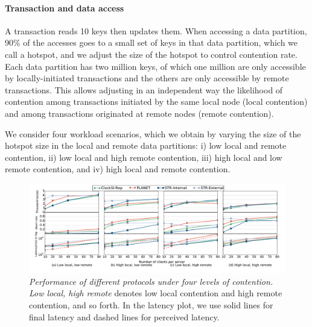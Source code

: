 \paragraph{Transaction and data access} A transaction reads 10 keys then updates them. When accessing a data partition, 90\% of the accesses goes to a small set of keys in that data partition, which we call a hotspot, and we adjust the size of the hotspot to control contention rate. Each data partition has two million keys, of which one million are only accessible by locally-initiated transactions and the others are only accessible by remote transactions. This allows adjusting in an independent way  the likelihood of contention among transactions initiated by the same local node (local contention) and among transactions originated at remote nodes (remote contention).

We consider four workload scenarios, which we obtain by varying the size of the hotspot size in the local and remote data partitions: i) low local and remote contention, ii) low local  and high remote contention, iii) high local and low remote contention, and iv) high local and remote contention.%



\begin{figure}
\centering
\def\svgwidth{0.98\columnwidth}
\includegraphics[scale=0.35]{figures/micro}
\vspace{-9mm}
\caption{\small \textit{Performance of different protocols under four levels of contention.} \textit{Low local, high remote} denotes low local contention and high remote contention, and so forth. In the latency plot, we use solid lines for final latency and dashed lines for  perceived latency.}
\label{fig:micro}
\end{figure}


